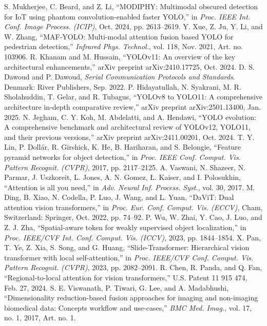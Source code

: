 \begin{thebibliography}{00}
 S. Mukherjee, C. Beard, and Z. Li, ``MODIPHY: Multimodal obscured detection for IoT using phantom convolution-enabled faster YOLO,'' in {\it Proc. IEEE Int. Conf. Image Process. (ICIP)}, Oct. 2024, pp. 2613--2619.
 Y. Xue, Z. Ju, Y. Li, and W. Zhang, ``MAF-YOLO: Multi-modal attention fusion based YOLO for pedestrian detection,'' {\it Infrared Phys. Technol.}, vol. 118, Nov. 2021, Art. no. 103906.
 R. Khanam and M. Hussain, ``YOLOv11: An overview of the key architectural enhancements,'' arXiv preprint arXiv:2410.17725, Oct. 2024.
 D. S. Dawoud and P. Dawoud, {\it Serial Communication Protocols and Standards}. Denmark: River Publishers, Sep. 2022.
 P. Hidayatullah, N. Syakrani, M. R. Sholahuddin, T. Gelar, and R. Tubagus, ``YOLOv8 to YOLO11: A comprehensive architecture in-depth comparative review,'' arXiv preprint arXiv:2501.13400, Jan. 2025.
 N. Jegham, C. Y. Koh, M. Abdelatti, and A. Hendawi, ``YOLO evolution: A comprehensive benchmark and architectural review of YOLOv12, YOLO11, and their previous versions,'' arXiv preprint arXiv:2411.00201, Oct. 2024.
 T. Y. Lin, P. Dollár, R. Girshick, K. He, B. Hariharan, and S. Belongie, ``Feature pyramid networks for object detection,'' in {\it Proc. IEEE Conf. Comput. Vis. Pattern Recognit. (CVPR)}, 2017, pp. 2117--2125.
 A. Vaswani, N. Shazeer, N. Parmar, J. Uszkoreit, L. Jones, A. N. Gomez, Ł. Kaiser, and I. Polosukhin, ``Attention is all you need,'' in {\it Adv. Neural Inf. Process. Syst.}, vol. 30, 2017.
 M. Ding, B. Xiao, N. Codella, P. Luo, J. Wang, and L. Yuan, ``DaViT: Dual attention vision transformers,'' in {\it Proc. Eur. Conf. Comput. Vis. (ECCV)}, Cham, Switzerland: Springer, Oct. 2022, pp. 74--92.
 P. Wu, W. Zhai, Y. Cao, J. Luo, and Z. J. Zha, ``Spatial-aware token for weakly supervised object localization,'' in {\it Proc. IEEE/CVF Int. Conf. Comput. Vis. (ICCV)}, 2023, pp. 1844--1854.
 X. Pan, T. Ye, Z. Xia, S. Song, and G. Huang, ``Slide-Transformer: Hierarchical vision transformer with local self-attention,'' in {\it Proc. IEEE/CVF Conf. Comput. Vis. Pattern Recognit. (CVPR)}, 2023, pp. 2082--2091.
 R. Chen, R. Panda, and Q. Fan, ``Regional-to-local attention for vision transformers,'' U.S. Patent 11 915 474, Feb. 27, 2024.
 S. E. Viswanath, P. Tiwari, G. Lee, and A. Madabhushi, ``Dimensionality reduction-based fusion approaches for imaging and non-imaging biomedical data: Concepts workflow and use-cases,'' {\it BMC Med. Imag.}, vol. 17, no. 1, 2017, Art. no. 1.

\end{thebibliography}
